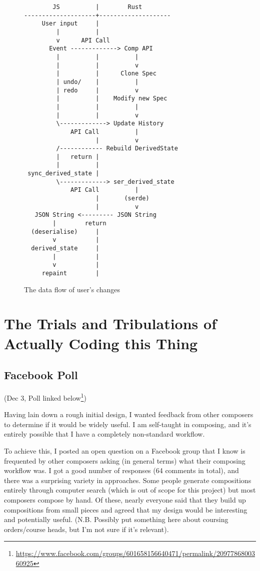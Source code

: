\documentclass[12pt]{article}
\newcommand{\footurl}[1]{\footnote{\url{#1}}}
\begin{document}
\begin{figure}
    \centering
    \begin{BVerbatim}
        JS          |        Rust
--------------------+--------------------
     User input     |
         |          |
         v      API Call
       Event -------------> Comp API
         |          |          |
         |          |          v
         |          |      Clone Spec
         | undo/    |          |
         | redo     |          v
         |          |    Modify new Spec
         |          |          |
         |          |          v
         \-------------> Update History
             API Call          |
                    |          v
         /------------ Rebuild DerivedState
         |   return |
         |          |
 sync_derived_state |
         \-------------> ser_derived_state
             API Call          |
                    |       (serde)
                    |          v
   JSON String <--------- JSON String
        |        return
  (deserialise)     |
        v           |
  derived_state     |
        |           |
        v           |
     repaint        |
    \end{BVerbatim}
    \caption{The data flow of user's changes}\label{fig:app_data_flow}
\end{figure}



\pagebreak

\section{The Trials and Tribulations of Actually Coding this Thing}

\subsection{Facebook Poll}

(Dec 3, Poll linked
below\footurl{https://www.facebook.com/groups/601658156640471/permalink/2097786800360925})

Having lain down a rough initial design, I wanted feedback from other composers to determine if it
would be widely useful.  I am self-taught in composing, and it's entirely possible that I have a
completely non-standard workflow.

To achieve this, I posted an open question on a Facebook group that I know is frequented by other
composers asking (in general terms) what their composing workflow was.  I got a good number of
responses (64 comments in total), and there was a surprising variety in approaches.  Some people
generate compositions entirely through computer search (which is out of scope for this project) but
most composers compose by hand.  Of these, nearly everyone said that they build up compositions from
small pieces and agreed that my design would be interesting and potentially useful.  (N.B. Possibly
put something here about coursing orders/course heads, but I'm not sure if it's relevant).
\end{document}
